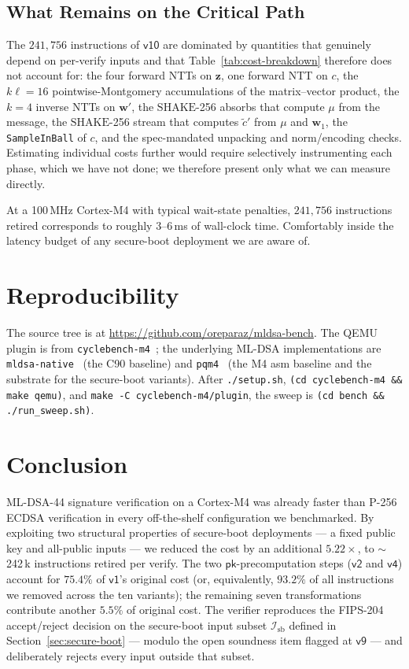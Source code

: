 \documentclass[11pt,a4paper]{article}
\newcommand{\SHAKE}{\mathrm{SHAKE}}
\begin{document}
\subsection{What Remains on the Critical Path}

The $241{,}756$ instructions of $\textsf{v10}$ are dominated by
quantities that genuinely depend on per-verify inputs and that
Table~\ref{tab:cost-breakdown} therefore does not account for: the
four forward NTTs on $\mathbf{z}$, one forward NTT on $c$, the
$k\ell = 16$ pointwise-Montgomery accumulations of the matrix--vector
product, the $k = 4$ inverse NTTs on $\hat{\mathbf{w}}'$, the
$\SHAKE$-256 absorbs that compute $\mu$ from the message, the
$\SHAKE$-256 stream that computes $\tilde c'$ from $\mu$ and
$\mathbf{w}_1$, the \texttt{SampleInBall} of $c$, and the spec-mandated
unpacking and norm/encoding checks. Estimating individual costs further
would require selectively instrumenting each phase, which we have not
done; we therefore present only what we can measure directly.

At a 100\,MHz Cortex-M4 with typical wait-state penalties, $241{,}756$
instructions retired corresponds to roughly $3$--$6$\,ms of wall-clock
time. Comfortably inside the latency budget of any secure-boot
deployment we are aware of.

\section{Reproducibility}

The source tree is at \url{https://github.com/oreparaz/mldsa-bench}. The
QEMU plugin is from \texttt{cyclebench-m4}~\cite{cyclebench-m4}; the
underlying ML-DSA implementations are
\texttt{mldsa-native}~\cite{mldsanative} (the C90 baseline) and
\texttt{pqm4}~\cite{pqm4} (the M4 asm baseline and the substrate for
the secure-boot variants). After \texttt{./setup.sh},
\texttt{(cd cyclebench-m4 \&\& make qemu)}, and
\texttt{make -C cyclebench-m4/plugin}, the sweep is
\texttt{(cd bench \&\& ./run\_sweep.sh)}.

\section{Conclusion}

ML-DSA-44 signature verification on a Cortex-M4 was already faster than
P-256 ECDSA verification in every off-the-shelf configuration we
benchmarked. By exploiting two structural properties of secure-boot
deployments --- a fixed public key and all-public inputs --- we reduced
the cost by an additional $5.22\times$, to $\sim$242\,k instructions
retired per verify. The two $\textsf{pk}$-precomputation steps
($\textsf{v2}$ and $\textsf{v4}$) account for $75.4\%$ of $\textsf{v1}$'s
original cost (or, equivalently, $93.2\%$ of all instructions we removed
across the ten variants); the remaining seven transformations contribute
another $5.5\%$ of original cost. The verifier reproduces the FIPS-204
accept/reject decision on the secure-boot input subset
$\mathcal{I}_{\mathrm{sb}}$ defined in Section~\ref{sec:secure-boot} ---
modulo the open soundness item flagged at $\textsf{v9}$ --- and
deliberately rejects every input outside that subset.
\end{document}
